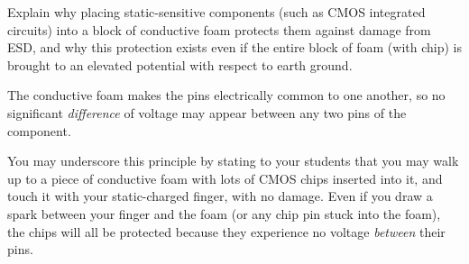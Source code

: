 

Explain why placing static-sensitive components (such as CMOS integrated circuits) into a block of conductive foam protects them against damage from ESD, and why this protection exists even if the entire block of foam (with chip) is brought to an elevated potential with respect to earth ground.







The conductive foam makes the pins electrically common to one another, so no significant {\it difference} of voltage may appear between any two pins of the component.







You may underscore this principle by stating to your students that you may walk up to a piece of conductive foam with lots of CMOS chips inserted into it, and touch it with your static-charged finger, with no damage.  Even if you draw a spark between your finger and the foam (or any chip pin stuck into the foam), the chips will all be protected because they experience no voltage {\it between} their pins.




